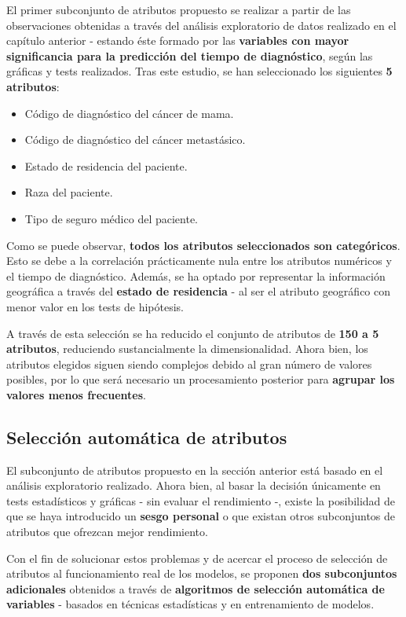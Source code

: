 El primer subconjunto de atributos propuesto se realizar a partir de las observaciones obtenidas a través del análisis exploratorio de datos realizado en el capítulo anterior - estando éste formado por las \textbf{variables con mayor significancia para la predicción del tiempo de diagnóstico}, según las gráficas y tests realizados. Tras este estudio, se han seleccionado los siguientes \textbf{5 atributos}:

\begin{itemize}[parsep=1pt, itemsep=1pt, topsep=4pt]
	\item Código de diagnóstico del cáncer de mama.
	\item Código de diagnóstico del cáncer metastásico.
	\item Estado de residencia del paciente.
	\item Raza del paciente.
	\item Tipo de seguro médico del paciente.
\end{itemize}

Como se puede observar, \textbf{todos los atributos seleccionados son categóricos}. Esto se debe a la correlación prácticamente nula entre los atributos numéricos y el tiempo de diagnóstico. Además, se ha optado por representar la información geográfica a través del \textbf{estado de residencia} - al ser el atributo geográfico con menor valor en los tests de hipótesis.

A través de esta selección se ha reducido el conjunto de atributos de \textbf{150 a 5 atributos}, reduciendo sustancialmente la dimensionalidad. Ahora bien, los atributos elegidos siguen siendo complejos debido al gran número de valores posibles, por lo que será necesario un procesamiento posterior para \textbf{agrupar los valores menos frecuentes}.

\subsection{Selección automática de atributos}

El subconjunto de atributos propuesto en la sección anterior está basado en el análisis exploratorio realizado. Ahora bien, al basar la decisión únicamente en tests estadísticos y gráficas - sin evaluar el rendimiento -, existe la posibilidad de que se haya introducido un \textbf{sesgo personal} o que existan otros subconjuntos de atributos que ofrezcan mejor rendimiento.

Con el fin de solucionar estos problemas y de acercar el proceso de selección de atributos al funcionamiento real de los modelos, se proponen \textbf{dos subconjuntos adicionales} obtenidos a través de \textbf{algoritmos de selección automática de variables} \cite{featureselection} - basados en técnicas estadísticas y en entrenamiento de modelos.


